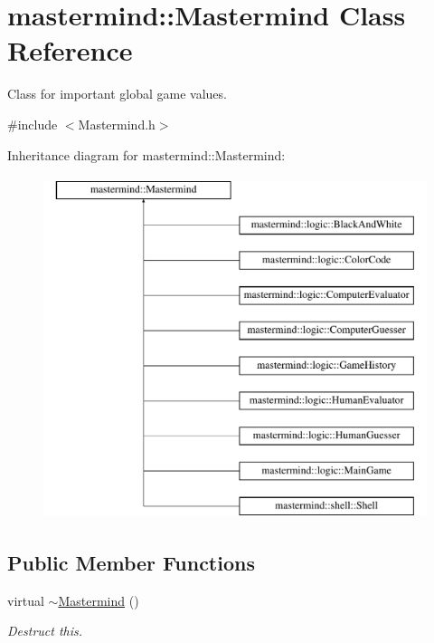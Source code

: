 \hypertarget{classmastermind_1_1_mastermind}{}\section{mastermind\+:\+:Mastermind Class Reference}
\label{classmastermind_1_1_mastermind}


Class for important global game values.  




{\ttfamily \#include $<$Mastermind.\+h$>$}

Inheritance diagram for mastermind\+:\+:Mastermind\+:\begin{figure}[H]
\begin{center}
\leavevmode
\includegraphics[height=10.000000cm]{classmastermind_1_1_mastermind}
\end{center}
\end{figure}
\subsection*{Public Member Functions}
\begin{DoxyCompactItemize}
\item 
virtual \hyperlink{classmastermind_1_1_mastermind_ac7d104e1c2febabb8d819de2ba447487}{$\sim$\+Mastermind} ()
\begin{DoxyCompactList}\small\item\em Destruct this. \end{DoxyCompactList}\end{DoxyCompactItemize}
